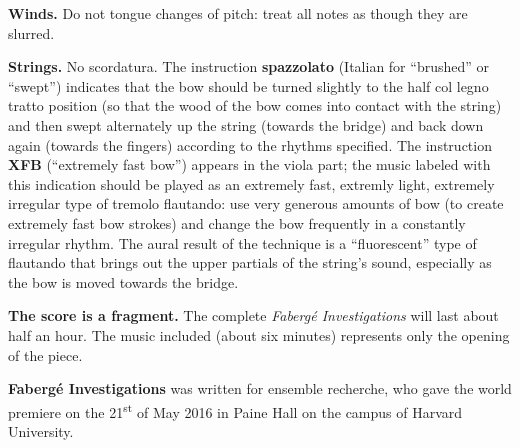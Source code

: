 \documentclass[10pt]{article}
\begin{document}
\textbf{Winds.} Do not tongue changes of pitch: treat all notes as though they
are slurred. 

\textbf{Strings.} No scordatura. The instruction \textbf{spazzolato} (Italian
for ``brushed'' or ``swept'') indicates that the bow should be turned slightly
to the half col legno tratto position (so that the wood of the bow comes into
contact with the string) and then swept alternately up the string (towards the
bridge) and back down again (towards the fingers) according to the rhythms
specified. The instruction \textbf{XFB} (``extremely fast bow'') appears in the
viola part; the music labeled with this indication should be played as an
extremely fast, extremly light, extremely irregular type of tremolo flautando:
use very generous amounts of bow (to create extremely fast bow strokes) and
change the bow frequently in a constantly irregular rhythm. The aural result of
the technique is a ``fluorescent'' type of flautando that brings out the upper
partials of the string's sound, especially as the bow is moved towards the
bridge.

\textbf{The score is a fragment.} The complete \textit{Faberg\'{e}
Investigations} will last about half an hour. The music included (about six
minutes) represents only the opening of the piece.

\vfill

\textbf{Faberg\'{e} Investigations} was written for ensemble recherche, who
gave the world premiere on the 21\textsuperscript{st} of May 2016 in Paine Hall
on the campus of Harvard University.
\end{document}
